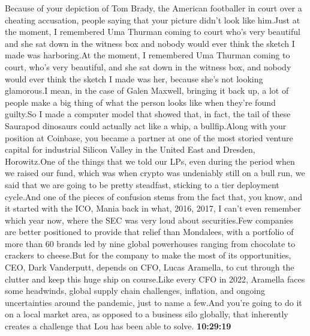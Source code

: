 \documentclass{article}%
\begin{document}
Because of your depiction of Tom Brady, the American footballer in court over a cheating accusation, people saying that your picture didn't look like him.Just at the moment, I remembered Uma Thurman coming to court who's very beautiful and she sat down in the witness box and nobody would ever think the sketch I made was harboring.At the moment, I remembered Uma Thurman coming to court, who's very beautiful, and she sat down in the witness box, and nobody would ever think the sketch I made was her, because she's not looking glamorous.I mean, in the case of Galen Maxwell, bringing it back up, a lot of people make a big thing of what the person looks like when they're found guilty.So I made a computer model that showed that, in fact, the tail of these Saurapod dinosaurs could actually act like a whip, a bullfip.Along with your position at Coinbase, you became a partner at one of the most storied venture capital for industrial Silicon Valley in the United East and Dresden, Horowitz.One of the things that we told our LPs, even during the period when we raised our fund, which was when crypto was undeniably still on a bull run, we said that we are going to be pretty steadfast, sticking to a tier deployment cycle.And one of the pieces of confusion stems from the fact that, you know, and it started with the ICO, Mania back in what, 2016, 2017, I can't even remember which year now, where the SEC was very loud about securities.Few companies are better positioned to provide that relief than Mondalees, with a portfolio of more than 60 brands led by nine global powerhouses ranging from chocolate to crackers to cheese.But for the company to make the most of its opportunities, CEO, Dark Vanderputt, depends on CFO, Lucas Aramella, to cut through the clutter and keep this huge ship on course.Like every CFO in 2022, Aramella faces some headwinds, global supply chain challenges, inflation, and ongoing uncertainties around the pandemic, just to name a few.And you're going to do it on a local market area, as opposed to a business silo globally, that inherently creates a challenge that Lou has been able to solve.%
\textbf{10:29:19}%
\end{document}
